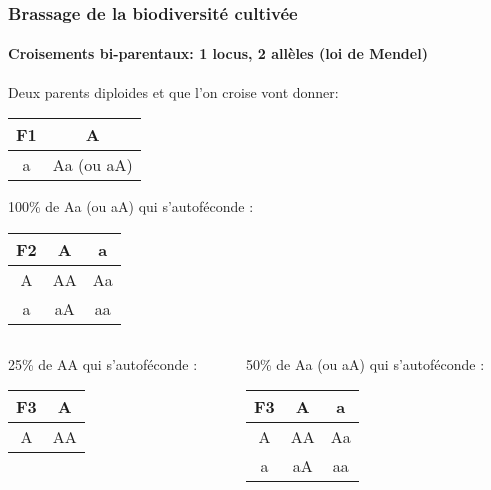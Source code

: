\begin{frame}
\frametitle{Brassage de la biodiversité cultivée}
\framesubtitle{Croisements bi-parentaux: 1 locus, 2 allèles (loi de Mendel)}


\begin{center}

Deux parents diploides  et  que l'on croise vont donner:

\begin{tabular}{|c|c|}
\hline
\textbf{F1} & A  \\
\hline
a & Aa (ou aA)\\
\hline
\end{tabular}

\vspace{.5cm}

100\% de Aa (ou aA) qui s'autoféconde : \\

\begin{tabular}{|c|c|c|}
\hline
\textbf{F2}& A & a \\
\hline
A & \cellcolor{mln-green} AA & Aa \\
\hline
a & aA & \cellcolor{mln-green} aa\\
\hline
\end{tabular}
\end{center}

\begin{columns}

\begin{column}{.3\textwidth}
\begin{center}
25\% de AA qui s'autoféconde : \\
\begin{tabular}{|c|c|}
\hline
\textbf{F3}& A  \\
\hline
A & \cellcolor{mln-green} AA \\
\hline
\end{tabular}
\end{center}
\end{column}

\begin{column}{.3\textwidth}
\begin{center}
50\% de  Aa (ou aA) qui s'autoféconde : \\
\begin{tabular}{|c|c|c|}
\hline
\textbf{F3}& A & a \\
\hline
A & \cellcolor{mln-green} AA & Aa \\
\hline
a & aA & \cellcolor{mln-green} aa\\
\hline
\end{tabular}
\end{center}
\end{column}


\end{columns}
\end{frame}
